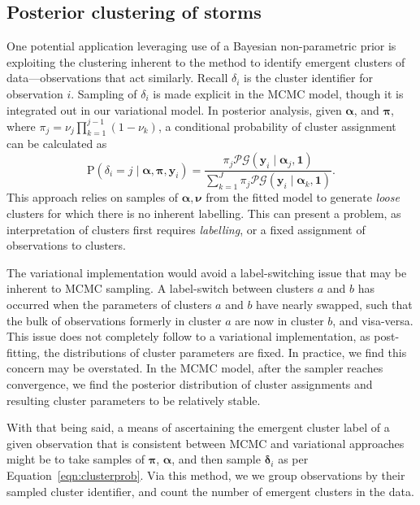 \subsection{Posterior clustering of storms}
One potential application leveraging use of a Bayesian non-parametric prior is 
    exploiting the clustering inherent to the method to identify emergent clusters of
    data---observations that act similarly.  Recall $\delta_i$ is the 
    cluster identifier for observation $i$.  Sampling of $\delta_i$ is made explicit in
    the MCMC model, though it is integrated out in our variational model. In
    posterior analysis, given $\bm{\alpha}$, and $\bm{\pi}$, where 
    $\pi_j = \nu_j\prod_{k = 1}^{j-1}(1 - \nu_k)$, a conditional probability of cluster 
    assignment can be calculated as
    \begin{equation}
        \label{eqn:clusterprob}
        \text{P}\left(\delta_i = j\mid\bm{\alpha},\bm{\pi},\bm{y}_i\right) 
            = \frac{\pi_j\mathcal{PG}(\bm{y}_i\mid\bm{\alpha}_j,\bm{1})}{
            \sum_{k = 1}^J \pi_j\mathcal{PG}(\bm{y}_i\mid\bm{\alpha}_k,\bm{1})}.
    \end{equation}
    This approach relies on samples of $\bm{\alpha},\bm{\nu}$ from the fitted
    model to generate \emph{loose} clusters for which there is no inherent 
    labelling.  This can present a problem, as interpretation of clusters first 
    requires \emph{labelling}, or a fixed assignment of observations to clusters.

The variational implementation would avoid a label-switching issue that may be inherent 
    to MCMC sampling.  A label-switch between clusters $a$ and $b$ has occurred when
    the parameters of clusters $a$ and $b$ have nearly swapped, such that the
    bulk of observations formerly in cluster $a$ are now in cluster $b$, and 
    visa-versa.  This issue does not completely follow to a variational 
    implementation, as post-fitting, the distributions of cluster parameters are 
    fixed.  In practice, we find this concern may be overstated.  In the MCMC model,
    after the sampler reaches convergence, we find the posterior distribution of 
    cluster assignments and resulting cluster parameters to be relatively stable.

With that being said, a means of ascertaining the emergent cluster label of a
    given observation that is consistent between MCMC and variational approaches
    might be to take samples of $\bm{\pi}$, $\bm{\alpha}$, and then sample
    $\bm{\delta}_i$ as per Equation~\eqref{eqn:clusterprob}.  Via this method, we
    we group observations by their sampled cluster identifier, and count the number
    of emergent clusters in the data.

